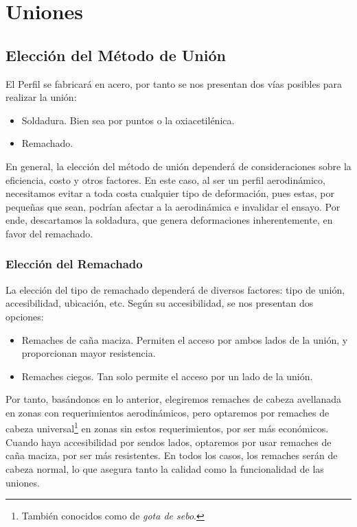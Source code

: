 \chapter{Uniones}

\section{Elección del Método de Unión}
El Perfil se fabricará en acero, por tanto se nos presentan dos vías posibles para realizar la unión:
\begin{itemize}
    \item Soldadura. Bien sea por puntos o la oxiacetilénica.
    \item Remachado.
\end{itemize}

En general, la elección del método de unión dependerá de consideraciones sobre la eficiencia, costo y otros factores. En este caso, al ser un perfil aerodinámico, necesitamos evitar a toda costa cualquier tipo de deformación, pues estas, por pequeñas que sean, podrían afectar a la aerodinámica e invalidar el ensayo. Por ende, descartamos la soldadura, que genera deformaciones inherentemente, en favor del remachado.

\subsection{Elección del Remachado}
La elección del tipo de remachado dependerá de diversos factores: tipo de unión, accesibilidad, ubicación, etc. Según su accesibilidad, se nos presentan dos opciones:
\begin{itemize}
    \item Remaches de caña maciza. Permiten el acceso por ambos lados de la unión, y proporcionan mayor resistencia. 
    \item Remaches ciegos. Tan solo permite el acceso por un lado de la unión.
\end{itemize}

Por tanto, basándonos en lo anterior, elegiremos remaches de cabeza avellanada en zonas con requerimientos aerodinámicos, pero optaremos por remaches de cabeza universal\footnote{También conocidos como de \textit{gota de sebo}.} en zonas sin estos requerimientos, por ser más económicos. Cuando haya accesibilidad por sendos lados, optaremos por usar remaches de caña maciza, por ser más resistentes. En todos los casos, los remaches serán de cabeza normal, lo que asegura tanto la calidad como la funcionalidad de las uniones.

